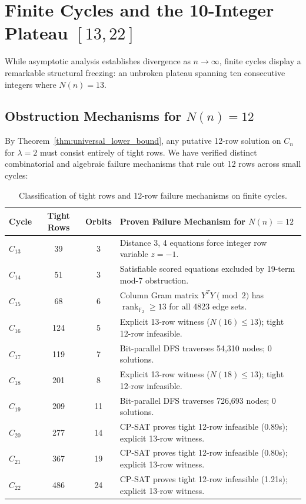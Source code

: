 \documentclass[11pt,a4paper]{article}
\theoremstyle{definition}
\theoremstyle{remark}
\begin{document}
\section{Finite Cycles and the 10-Integer Plateau $[13, 22]$}
\label{sec:finite_cases}

While asymptotic analysis establishes divergence as $n \to \infty$, finite cycles display a remarkable structural freezing: an unbroken plateau spanning ten consecutive integers where $N(n) = 13$.

\subsection{Obstruction Mechanisms for $N(n) = 12$}

By Theorem~\ref{thm:universal_lower_bound}, any putative 12-row solution on $C_n$ for $\lambda = 2$ must consist entirely of tight rows. We have verified distinct combinatorial and algebraic failure mechanisms that rule out 12 rows across small cycles:

\begin{table}[htbp]
\centering
\caption{Classification of tight rows and 12-row failure mechanisms on finite cycles.}
\label{tab:finite_summary}
\begin{tabular}{lccl}
\toprule
Cycle & Tight Rows & Orbits & Proven Failure Mechanism for $N(n) = 12$ \\
\midrule
$C_{13}$ & 39 & 3 & Distance 3, 4 equations force integer row variable $z = -1$. \\
$C_{14}$ & 51 & 3 & Satisfiable scored equations excluded by 19-term mod-7 obstruction. \\
$C_{15}$ & 68 & 6 & Column Gram matrix $Y^T Y \pmod 2$ has $\operatorname{rank}_{\mathbb{F}_2} \ge 13$ for all 4823 edge sets. \\
$C_{16}$ & 124 & 5 & Explicit 13-row witness ($N(16) \le 13$); tight 12-row infeasible. \\
$C_{17}$ & 119 & 7 & Bit-parallel DFS traverses 54,310 nodes; 0 solutions. \\
$C_{18}$ & 201 & 8 & Explicit 13-row witness ($N(18) \le 13$); tight 12-row infeasible. \\
$C_{19}$ & 209 & 11 & Bit-parallel DFS traverses 726,693 nodes; 0 solutions. \\
$C_{20}$ & 277 & 14 & CP-SAT proves tight 12-row infeasible (0.89s); explicit 13-row witness. \\
$C_{21}$ & 367 & 19 & CP-SAT proves tight 12-row infeasible (0.80s); explicit 13-row witness. \\
$C_{22}$ & 486 & 24 & CP-SAT proves tight 12-row infeasible (1.21s); explicit 13-row witness. \\
\bottomrule
\end{tabular}
\end{table}
\end{document}
